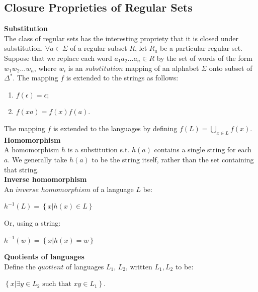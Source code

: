 \documentclass[a4paper]{article}
\begin{document}
\subsection{Closure Proprieties of Regular Sets} %
\label{sub:Substitution and homomorphism}
{\bf Substitution} \\
The class of regular sets has the interesting propriety that it is closed under substitution. $\forall a \in \Sigma$ of a regular
subset $R$, let $R_a$ be a particular regular set. Suppose that we replace each word $a_1a_2\dots a_n \in R$ by the set of words of the form $w_1w_2 \dots w_n$, where $w_i$ is an $substitution$ mapping of an alphabet $\Sigma$ onto subset of $\Delta^*$.
The mapping $f$ is extended to the strings as follows: \\
\begin{enumerate}
  \item $f(\epsilon)=\epsilon$;
  \item $f(xa)=f(x)f(a)$.
\end{enumerate}
The mapping $f$ is extended to the languages by defining $f(L)=\bigcup_{x \in L}f(x)$. \\
{\bf Homomorphism} \\
A homomorphism $h$ is a substitution s.t. $h(a)$ contains a single string for each $a$. We generally take $h(a)$ to be the string itself, rather than the set containing that string. \\
{\bf Inverse homomorphism} \\
An $inverse$ $homomorphism$ of a language $L$ be:
\begin{center}
  $h^{-1}(L)=\left\{ x|h(x) \in L \right\}$
\end{center}
Or, using a string:
\begin{center}
  $h^{-1}(w)=\left\{ x|h(x) = w \right\}$
\end{center}
{\bf Quotients of languages} \\
Define the $quotient$ of languages $L_1$, $L_2$, written $L_1,L_2$ to be:
\begin{center}
  $\left\{ x| \exists y \in L_2 \text{ such that } xy \in L_1 \right\}$.
\end{center}
\end{document}
